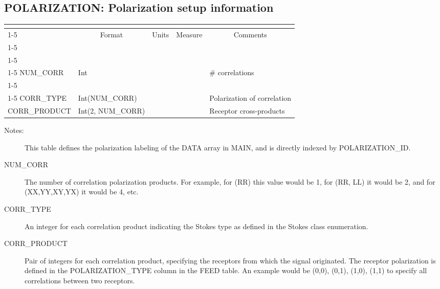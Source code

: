 \documentclass{article}
\newcommand{\defline}[1]{\cline{1-5}
\multicolumn{5}{|l|}{#1} \\
\cline{1-5}}
\newcommand{\definetable}[3][]
{
  \vfill\newpage
  \subsection{#2}
  \label{tbl:#1}
  \vspace{0.15in}
  \small
  \begin{tabular}{|l|p{1.25in}|l|p{.9in}|p{1.4in}|}
  \hline
  \multicolumn{5}{|c|}{\bf #1}\\
  \cline{1-5}
  \multicolumn{1}{|c|}{Name}&\multicolumn{1}{|c|}{Format}&
  \multicolumn{1}{|c|}{Units}&\multicolumn{1}{|c|}{Measure}&
  \multicolumn{1}{|c|}{Comments}\\
  \cline{1-5}
  #3
  \hline
  \end{tabular}
}
\begin{document}
\definetable{POLARIZATION: Polarization setup information}{
\defline{\bf Columns}
\defline{\em Data description columns}
NUM\_CORR   &     Int  &           &        & \# correlations\\
\defline{\em Data}
CORR\_TYPE & Int(NUM\_CORR) & & & Polarization of correlation \\
CORR\_PRODUCT &  Int(2, NUM\_CORR) &  & & Receptor cross-products \\
}
\begin{description}

\item[Notes:] This table defines the polarization labeling of the DATA
array in MAIN, and is directly indexed by  POLARIZATION\_ID.

\item[NUM\_CORR] The number of correlation polarization products. For
example, for (RR) this value would be 1, for (RR, LL) it would be 2,
and for (XX,YY,XY,YX) it would be 4, etc.

\item[CORR\_TYPE] An integer for each correlation product indicating
the Stokes type as defined in the Stokes class enumeration.

\item[CORR\_PRODUCT] Pair of integers for each correlation product,
specifying the receptors from which the signal originated.  The
receptor polarization is defined in the POLARIZATION\_TYPE column in
the FEED table. An example would be (0,0), (0,1), (1,0), (1,1) to
specify all correlations between two receptors.

\end{description}
\end{document}
